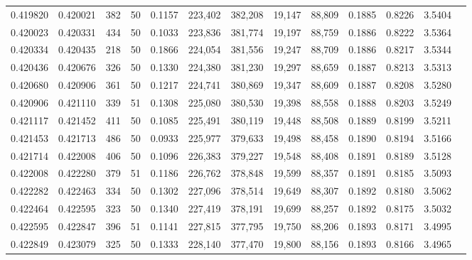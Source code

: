 \begin{tabular}{rrrrrrrrrrrrr}
0.419820 & 0.420021 &   382 &  50 &                                     0.1157 & 223,402 & 382,208 &  19,147 &  88,809 & 0.1885 & 0.8226 & 3.5404 \\
0.420023 & 0.420331 &   434 &  50 &                                     0.1033 & 223,836 & 381,774 &  19,197 &  88,759 & 0.1886 & 0.8222 & 3.5364 \\
0.420334 & 0.420435 &   218 &  50 &                                     0.1866 & 224,054 & 381,556 &  19,247 &  88,709 & 0.1886 & 0.8217 & 3.5344 \\
0.420436 & 0.420676 &   326 &  50 &                                     0.1330 & 224,380 & 381,230 &  19,297 &  88,659 & 0.1887 & 0.8213 & 3.5313 \\
0.420680 & 0.420906 &   361 &  50 &                                     0.1217 & 224,741 & 380,869 &  19,347 &  88,609 & 0.1887 & 0.8208 & 3.5280 \\
0.420906 & 0.421110 &   339 &  51 &                                     0.1308 & 225,080 & 380,530 &  19,398 &  88,558 & 0.1888 & 0.8203 & 3.5249 \\
0.421117 & 0.421452 &   411 &  50 &                                     0.1085 & 225,491 & 380,119 &  19,448 &  88,508 & 0.1889 & 0.8199 & 3.5211 \\
0.421453 & 0.421713 &   486 &  50 &                                     0.0933 & 225,977 & 379,633 &  19,498 &  88,458 & 0.1890 & 0.8194 & 3.5166 \\
0.421714 & 0.422008 &   406 &  50 &                                     0.1096 & 226,383 & 379,227 &  19,548 &  88,408 & 0.1891 & 0.8189 & 3.5128 \\
0.422008 & 0.422280 &   379 &  51 &                                     0.1186 & 226,762 & 378,848 &  19,599 &  88,357 & 0.1891 & 0.8185 & 3.5093 \\
0.422282 & 0.422463 &   334 &  50 &                                     0.1302 & 227,096 & 378,514 &  19,649 &  88,307 & 0.1892 & 0.8180 & 3.5062 \\
0.422464 & 0.422595 &   323 &  50 &                                     0.1340 & 227,419 & 378,191 &  19,699 &  88,257 & 0.1892 & 0.8175 & 3.5032 \\
0.422595 & 0.422847 &   396 &  51 &                                     0.1141 & 227,815 & 377,795 &  19,750 &  88,206 & 0.1893 & 0.8171 & 3.4995 \\
0.422849 & 0.423079 &   325 &  50 &                                     0.1333 & 228,140 & 377,470 &  19,800 &  88,156 & 0.1893 & 0.8166 & 3.4965 \\

\end{tabular}

